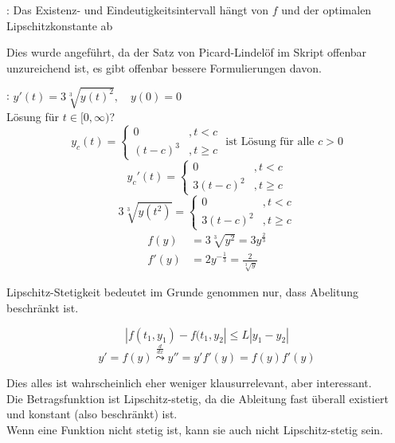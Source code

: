 \documentclass[
    accentcolor=pink,
    boxarc,
    dark_mode,
    logofile=enmpty
]{rubos-tuda-template}
\begin{document}
    : Das Existenz- und Eindeutigkeitsintervall hängt von $f$ und der optimalen Lipschitzkonstante ab
    \begin{anmerkung}
        Dies wurde angeführt, da der Satz von Picard-Lindelöf im Skript offenbar unzureichend ist, es gibt offenbar bessere Formulierungen davon.
    \end{anmerkung}
    : $y'(t)=3\sqrt[3]{y(t)^2},\quad y(0)=0$\\
    Lösung für $t\in[0,\infty)$?
    \[y_c(t)=\begin{cases}
            0       & ,t<c    \\
            (t-c)^3 & ,t\ge c
        \end{cases}\text{ ist Lösung für alle }c>0\]
    \[y_c'(t)=\begin{cases}
            0        & ,t<c    \\
            3(t-c)^2 & ,t\ge c
        \end{cases}\]
    \[3\sqrt[3]{y(t^2)}=\begin{cases}
            0        & ,t<c    \\
            3(t-c)^2 & ,t\ge c
        \end{cases}\]
    \begin{align*}
        f(y)  & =3\sqrt[3]{y^2}=3y^{\frac{2}{3}}       \\
        f'(y) & =2y^{-\frac{1}{3}}=\frac{2}{\sqrt[3]y}
    \end{align*}
    \begin{anmerkung}
        Lipschitz-Stetigkeit bedeutet im Grunde genommen nur, dass Abelitung beschränkt ist.
    \end{anmerkung}
    \[|f(t_1,y_1)-f(t_1,y_2|\le L|y_1-y_2|\]
    \[y'=f(y)\overset{\frac{d}{dx}}{\leadsto}y''=y'f'(y)=f(y)f'(y)\]
    \begin{anmerkungen}
        Dies alles ist wahrscheinlich eher weniger klausurrelevant, aber interessant.\\
        Die Betragsfunktion ist Lipschitz-stetig, da die Ableitung fast überall existiert und konstant (also beschränkt) ist.\\
        Wenn eine Funktion nicht stetig ist, kann sie auch nicht Lipschitz-stetig sein.
    \end{anmerkungen}
\end{document}
